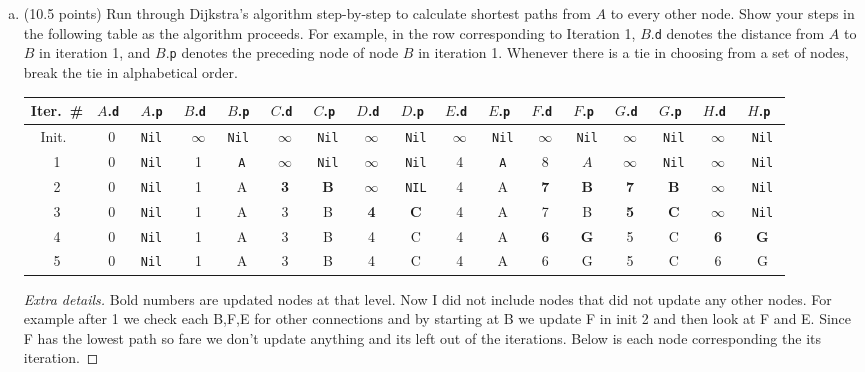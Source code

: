 \documentclass[12pt]{amsart}
\newcommand\TT[1]{\texttt{#1}}
\begin{document}
\begin{enumerate}[(a)]
\item (10.5 points) Run through Dijkstra's algorithm step-by-step to calculate  shortest paths from $A$ to every other node. 
Show your steps in the following table as the algorithm proceeds.
For example, in the row corresponding to Iteration 1, 
$B$.\texttt{d} 
denotes the 
distance from $A$ to $B$ in iteration 1, and $B$.\texttt{p} denotes the preceding node of node $B$ in iteration 1.
Whenever there is a tie in choosing from a set of nodes, break the tie in alphabetical order.


\begin{table}[h]
\begin{center}
\begin{tabular}{|c||c|c||c|c||c|c||c|c||c|c||c|c||c|c||c|c|} \hline
Iter.\ \# & $A$.\tt{d} & $A$.\tt{p} & $B$.\tt{d} & $B$.\tt{p} & $C$.\tt{d} & $C$.\tt{p} & $D$.\tt{d} & $D$.\tt{p} & $E$.\tt{d} & $E$.\tt{p} & $F$.\tt{d} & $F$.\tt{p} & $G$.\tt{d} & $G$.\tt{p} & $H$.\tt{d} & $H$.\tt{p} \\ \hline \hline
Init.\ & 0 & \tt{Nil} & $\infty$ & \tt{Nil} & $\infty$ & \TT{Nil} & $\infty$ & \TT{Nil} & $\infty$ & \TT{Nil} & $\infty$ & \TT{Nil} & $\infty$ & \TT{Nil}& $\infty$ & \TT{Nil} \\ \hline
1 & 0 & \tt{Nil} & 1 & \TT{A} & $\infty$ & \TT{Nil} & $\infty$ & \TT{Nil} & 4 & \TT{A} & 8 & $A$ & $\infty$ & \TT{Nil} & $\infty$ & \TT{Nil} \\ \hline
2 & 0 & \tt{Nil} & 1 & A & \textbf{3} & \textbf{B} & $\infty$ & \TT{NIL} & 4 & A  & \textbf{7} & \textbf{B} & \textbf{7} & \textbf{B} & $\infty$ & \TT{Nil} \\\hline
3 & 0 & \tt{Nil} & 1 & A & 3 & B & \textbf{4} & \textbf{C} & 4 & A & 7 & B & \textbf{5} & \textbf{C} & $\infty$ & \TT{Nil} \\ \hline
4 & 0 & \tt{Nil} & 1 & A & 3 & B & 4 & C & 4 & A & \textbf{6} & \textbf{G} & 5 & C & \textbf{6} & \textbf{G}\\ \hline
5 & 0 & \tt{Nil} & 1 & A & 3 & B & 4 & C & 4 & A & 6 & G & 5 & C &  6 & G\\ \hline

\end{tabular}
\end{center}
\end{table}%
\begin{proof}[Extra details]
Bold numbers are updated nodes at that level. Now I did not include nodes that did not update any other nodes. For example after 1 we check each B,F,E for other connections and by starting at B we update F in init 2 and then look at F and E. Since F has the lowest path so fare we don't update anything and its left out of the iterations. Below is each node corresponding the its iteration.



\end{proof}
\end{enumerate}
\end{document}
